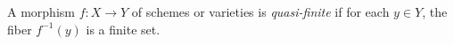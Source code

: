 \documentclass[12pt]{article}
\begin{document}
A morphism $f : X\to Y$ of schemes or varieties is {\em quasi-finite} if for each $y\in Y$, the fiber $f^{-1}(y)$ is a finite set.
\end{document}
